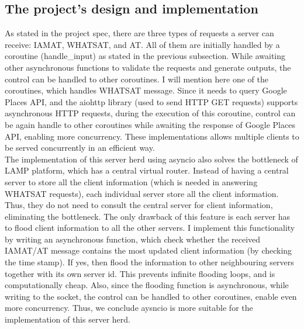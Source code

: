 \documentclass[letterpaper,twocolumn,10pt]{article}
\begin{document}
\subsection{The project's design and implementation}
As stated in the project spec, there are three types of requests a server can receive: IAMAT, WHATSAT, and AT. All of them are initially handled by a coroutine (handle\_input)  as stated in the previous subsection. While awaiting other asynchronous functions to validate the requests and generate outputs, the control can be handled to other coroutines. I will mention here one of the coroutines, which handles WHATSAT message. Since it needs to query Google Places API, and the aiohttp library (used to send HTTP GET requests) supports asynchronous HTTP requests, during the execution of this coroutine, control can be again handle to other coroutines while awaiting the response of Google Places API, enabling more concurrency. These implementations allows multiple clients to be served concurrently in an efficient way. \\

The implementation of this server herd using asyncio also solves the bottleneck of LAMP platform, which has a central virtual router. Instead of having a central server to store all the client information (which is needed in answering WHATSAT requests), each individual server store all the client information. Thus, they do not need to consult the central server for client information, eliminating the bottleneck. The only drawback of this feature is each server has to flood client information to all the other servers. I implement this functionality by writing an asynchronous function, which check whether the received IAMAT/AT message contains the most updated client information (by checking the time stamp). If yes, then flood the information to other neighbouring servers together with its own server id. This prevents infinite flooding loops, and is computationally cheap. Also, since the flooding function is asynchronous, while writing to the socket, the control can be handled to other coroutines, enable even more concurrency. Thus, we conclude aysncio is more suitable for the implementation of this server herd.
\end{document}

